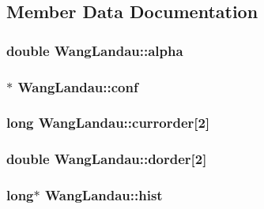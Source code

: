 \subsection{Member Data Documentation}
\hypertarget{class_wang_landau_a8bb1140ae96416553fe3c286e33446fa}{
\subsubsection[{alpha}]{\setlength{\rightskip}{0pt plus 5cm}double Wang\+Landau\+::alpha}}\label{class_wang_landau_a8bb1140ae96416553fe3c286e33446fa}
\hypertarget{class_wang_landau_acffd727c52c62ecf4bb12afbef005f91}{
\subsubsection[{conf}]{$\ast$ Wang\+Landau\+::conf}}\label{class_wang_landau_acffd727c52c62ecf4bb12afbef005f91}
\hypertarget{class_wang_landau_a1d6cf967b7c33ff4140109e17df8c842}{
\subsubsection[{currorder}]{\setlength{\rightskip}{0pt plus 5cm}long Wang\+Landau\+::currorder\mbox{[}2\mbox{]}}}\label{class_wang_landau_a1d6cf967b7c33ff4140109e17df8c842}
\hypertarget{class_wang_landau_afaa523a1ec9e61fcb7045fafd2612482}{
\subsubsection[{dorder}]{\setlength{\rightskip}{0pt plus 5cm}double Wang\+Landau\+::dorder\mbox{[}2\mbox{]}}}\label{class_wang_landau_afaa523a1ec9e61fcb7045fafd2612482}
\hypertarget{class_wang_landau_aeec23524069d5194edccbe4a62337b49}{
\subsubsection[{hist}]{\setlength{\rightskip}{0pt plus 5cm}long$\ast$ Wang\+Landau\+::hist}}\label{class_wang_landau_aeec23524069d5194edccbe4a62337b49}
